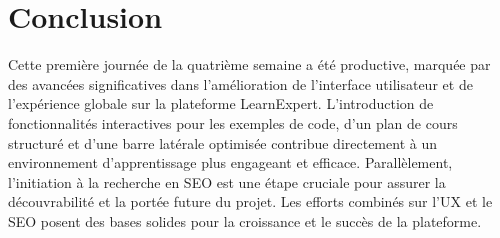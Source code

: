 \documentclass[12pt, a4paper]{article}
\begin{document}
\section{Conclusion}
Cette première journée de la quatrième semaine a été productive, marquée par des avancées significatives dans l'amélioration de l'interface utilisateur et de l'expérience globale sur la plateforme LearnExpert. L'introduction de fonctionnalités interactives pour les exemples de code, d'un plan de cours structuré et d'une barre latérale optimisée contribue directement à un environnement d'apprentissage plus engageant et efficace. Parallèlement, l'initiation à la recherche en SEO est une étape cruciale pour assurer la découvrabilité et la portée future du projet. Les efforts combinés sur l'UX et le SEO posent des bases solides pour la croissance et le succès de la plateforme.
\end{document}
